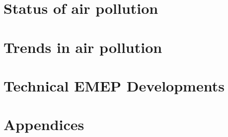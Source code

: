 \documentclass[a4paper,12pt,american,draft]{book}
\begin{document}
\frontmatter 
\pagestyle{fancy}


\cleardoublepage


\tableofcontents
\cleardoublepage

\mainmatter
\pagestyle{fancy}



\part{Status of air pollution}
 

\part{Trends in air pollution} 


\part{Technical EMEP Developments}



\part{Appendices}
\setcounter{part}{1}
\cleardoublepage
\setcounter{page}{1}
\begin{appendix}
\renewcommand{\theHchapter}{\Alph{chapter}}
\renewcommand{\thepage}{{\em page \Alph{chapter}:\arabic{page}}}
\renewcommand{\thepage}{{\Alph{chapter}:\arabic{page}}}
\renewcommand{\thetable}{\Alph{chapter}:\arabic{table}}








\end{appendix}
\end{document}

